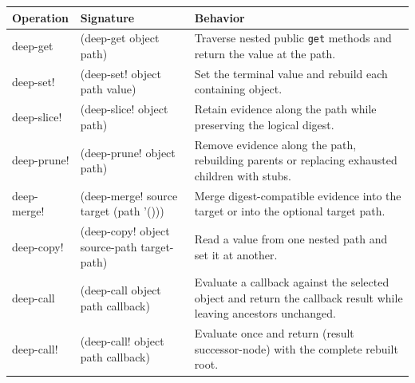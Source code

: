\begin{tabularx}{\textwidth}{@{}>{\ttfamily\raggedright\arraybackslash}p{}>{\ttfamily\raggedright\arraybackslash}p{}X@{}}
\toprule
\normalfont\textbf{Operation} & \normalfont\textbf{Signature} & \textbf{Behavior} \\
\midrule
deep-get    & (deep-get object path) & Traverse nested public \texttt{get} methods and return the value at the path. \\
deep-set!   & (deep-set! object path value) & Set the terminal value and rebuild each containing object. \\
deep-slice! & (deep-slice! object path) & Retain evidence along the path while preserving the logical digest. \\
deep-prune! & (deep-prune! object path) & Remove evidence along the path, rebuilding parents or replacing exhausted children with stubs. \\
deep-merge! & (deep-merge! source target (path '())) & Merge digest-compatible evidence into the target or into the optional target path. \\
deep-copy!  & (deep-copy! object source-path target-path) & Read a value from one nested path and set it at another. \\
deep-call   & (deep-call object path callback) & Evaluate a callback against the selected object and return the callback result while leaving ancestors unchanged. \\
deep-call!  & (deep-call! object path callback) & Evaluate once and return (result successor-node) with the complete rebuilt root. \\
\bottomrule
\end{tabularx}
